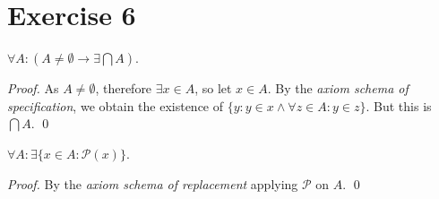 \documentclass[11pt]{llncs}
\begin{document}
\begin{figure}
\begin{algorithm}[H]
\begin{algorithmic}[0]
    \State{$) \land ($}
    \Indent
      \Indent
        \Indent
            \Indent
              \Indent
                \Indent
                  \Indent
                  \EndIndent
                  \State{$)$}
                \EndIndent
                \State{$)$}
              \EndIndent
              \State{$)$}
            \EndIndent
          \State{$)$}
        \EndIndent
        \State{$)$}
      \EndIndent
      \State{$)$}
    \EndIndent
    \State{$)$}
  \end{algorithmic}
\end{algorithm}
\end{figure}

\section*{Exercise 6}
\begin{lemma}
  $\forall A: (A \neq \emptyset \rightarrow \exists \bigcap A)$.
\end{lemma}
\begin{proof}
  As $A \neq \emptyset$, therefore $\exists x \in A$, so let $x \in A$.
  By the \emph{axiom schema of specification}, we obtain the existence of
  $\{y: y \in x \land \forall z \in A: y \in z\}$. But this is $\bigcap A$.
  \qed
\end{proof}

\begin{lemma}
  $\forall A: \exists \{x \in A: \mathcal{P}(x)\}$.
\end{lemma}
\begin{proof}
  By the \emph{axiom schema of replacement} applying $\mathcal{P}$ on $A$.
  \qed
\end{proof}
\end{document}
